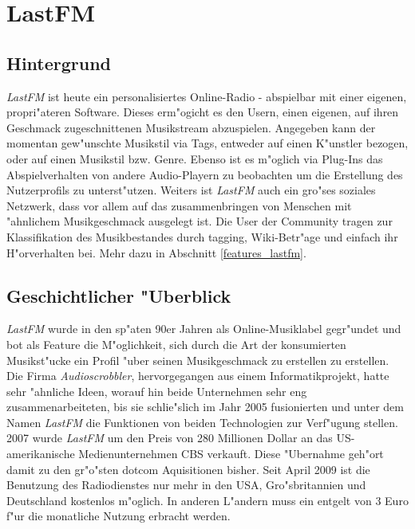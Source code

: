 \section{LastFM}
\subsection{Hintergrund}
\textit{LastFM} ist heute ein personalisiertes Online-Radio - abspielbar mit einer eigenen, propri"ateren Software. Dieses erm"ogicht es den Usern, einen eigenen, auf ihren Geschmack zugeschnittenen Musikstream abzuspielen. Angegeben kann der momentan gew"unschte Musikstil via Tags, entweder auf einen K"unstler bezogen, oder auf einen Musikstil bzw. Genre. Ebenso ist es m"oglich via Plug-Ins das Abspielverhalten von andere Audio-Playern zu beobachten um die Erstellung des Nutzerprofils zu unterst"utzen.
Weiters ist \textit{LastFM} auch ein gro"ses soziales Netzwerk, dass vor allem auf das zusammenbringen von Menschen mit "ahnlichem Musikgeschmack ausgelegt ist. Die User der Community tragen zur Klassifikation des Musikbestandes durch tagging, Wiki-Betr"age und einfach ihr H"orverhalten bei. Mehr dazu in Abschnitt \ref{features_lastfm}.

\subsection{Geschichtlicher "Uberblick}
\textit{LastFM} wurde in den sp"aten 90er Jahren als Online-Musiklabel gegr"undet und bot als Feature die M"oglichkeit, sich durch die Art der konsumierten Musikst"ucke ein Profil "uber seinen Musikgeschmack zu erstellen zu erstellen. Die Firma \textit{Audioscrobbler}, hervorgegangen aus einem Informatikprojekt, hatte sehr "ahnliche Ideen, worauf hin beide Unternehmen sehr eng zusammenarbeiteten, bis sie schlie"slich im Jahr 2005 fusionierten und unter dem Namen \textit{LastFM} die Funktionen von beiden Technologien zur Verf"ugung stellen.
2007 wurde \textit{LastFM} um den Preis von 280 Millionen Dollar an das US-amerikanische Medienunternehmen CBS verkauft. Diese "Ubernahme geh"ort damit zu den gr"o"sten dotcom Aquisitionen bisher. 
Seit April 2009 ist die Benutzung des Radiodienstes nur mehr in den USA, Gro"sbritannien und Deutschland kostenlos m"oglich. In anderen L"andern muss ein entgelt von 3 Euro f"ur die monatliche Nutzung erbracht werden.



